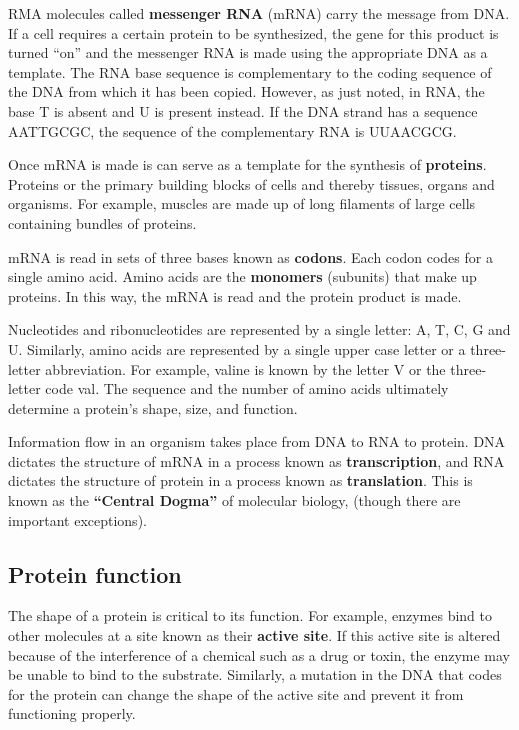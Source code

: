 \documentclass[
]{book}
\begin{document}
RMA molecules called \textbf{messenger RNA} (mRNA) carry the message from
DNA. If a cell requires a certain protein to be synthesized, the gene
for this product is turned ``on'' and the messenger RNA is made using the
appropriate DNA as a template. The RNA base sequence is complementary to
the coding sequence of the DNA from which it has been copied. However,
as just noted, in RNA, the base T is absent and U is present instead. If
the DNA strand has a sequence AATTGCGC, the sequence of the
complementary RNA is UUAACGCG.

Once mRNA is made is can serve as a template for the synthesis of
\textbf{proteins}. Proteins or the primary building blocks of cells and
thereby tissues, organs and organisms. For example, muscles are made up
of long filaments of large cells containing bundles of proteins.

mRNA is read in sets of three bases known as \textbf{codons}. Each codon
codes for a single amino acid. Amino acids are the \textbf{monomers}
(subunits) that make up proteins. In this way, the mRNA is read and the
protein product is made.

Nucleotides and ribonucleotides are represented by a single letter: A,
T, C, G and U. Similarly, amino acids are represented by a single upper
case letter or a three-letter abbreviation. For example, valine is known
by the letter V or the three-letter code val. The sequence and the
number of amino acids ultimately determine a protein's shape, size, and
function.

Information flow in an organism takes place from DNA to RNA to protein.
DNA dictates the structure of mRNA in a process known as
\textbf{transcription}, and RNA dictates the structure of protein in a
process known as \textbf{translation}. This is known as the \textbf{``Central
Dogma''} of molecular biology, (though there are important exceptions).

\hypertarget{protein-function}{%
\subsection{Protein function}\label{protein-function}}

The shape of a protein is critical to its function. For example, enzymes
bind to other molecules at a site known as their \textbf{active site}. If
this active site is altered because of the interference of a chemical
such as a drug or toxin, the enzyme may be unable to bind to the
substrate. Similarly, a mutation in the DNA that codes for the protein
can change the shape of the active site and prevent it from functioning
properly.
\end{document}

